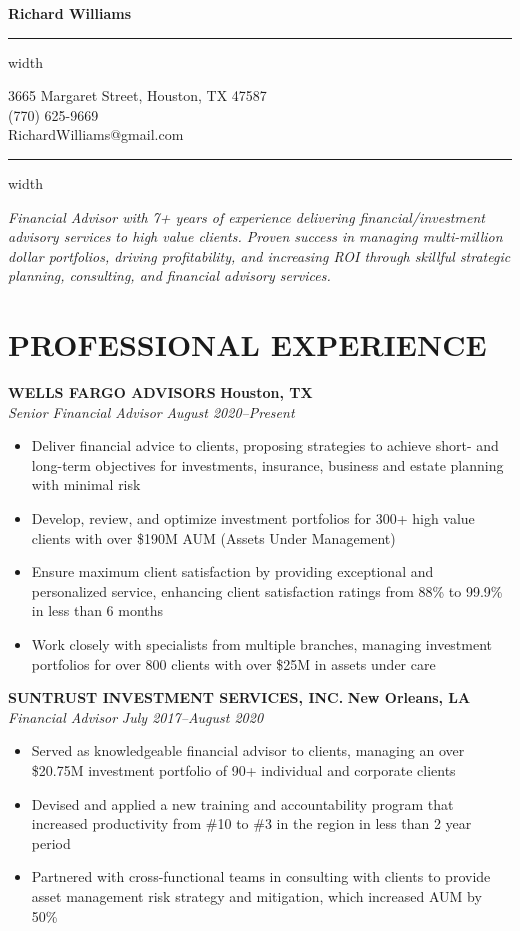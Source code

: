 \documentclass[11pt,letterpaper]{article}
\newcommand{\name}[1]{
  \begin{center}
    \Huge\textbf{#1}
  \end{center}
  \vspace{-0.5em}
  \hrule height 0.4pt width \textwidth
  \vspace{0.5em}
}
\newcommand{\contact}[3]{
  \begin{center}
    #1 \\ #2 \\ #3
  \end{center}
  \vspace{-0.5em}
  \hrule height 0.4pt width \textwidth
  \vspace{0.5em}
}
\newcommand{\role}[4]{
  \begin{center}
    \textbf{#1} \hfill \textbf{#2} \\
    \textit{#3} \hfill \textit{#4}
  \end{center}
}
\begin{document}
\name{Richard Williams}
\vspace{-0.5em}
\contact{3665 Margaret Street, Houston, TX 47587}{(770) 625-9669}{RichardWilliams@gmail.com}

\vspace{-0.5em}
\begin{center}
\textit{Financial Advisor with 7+ years of experience delivering financial/investment advisory services to high value clients. Proven success in managing multi-million dollar portfolios, driving profitability, and increasing ROI through skillful strategic planning, consulting, and financial advisory services.}
\end{center}

\section{PROFESSIONAL EXPERIENCE}

\vspace{1em}
\role{WELLS FARGO ADVISORS}{Houston, TX}{Senior Financial Advisor}{August 2020--Present}
\begin{itemize}[leftmargin=*,nosep]
  \item Deliver financial advice to clients, proposing strategies to achieve short- and long-term objectives for investments, insurance, business and estate planning with minimal risk
  \item Develop, review, and optimize investment portfolios for 300+ high value clients with over \$190M AUM (Assets Under Management)
  \item Ensure maximum client satisfaction by providing exceptional and personalized service, enhancing client satisfaction ratings from 88\% to 99.9\% in less than 6 months
  \item Work closely with specialists from multiple branches, managing investment portfolios for over 800 clients with over \$25M in assets under care
\end{itemize}

\role{SUNTRUST INVESTMENT SERVICES, INC.}{New Orleans, LA}{Financial Advisor}{July 2017--August 2020}
\begin{itemize}[leftmargin=*,nosep,topsep=0pt]
  \item Served as knowledgeable financial advisor to clients, managing an over \$20.75M investment portfolio of 90+ individual and corporate clients
  \item Devised and applied a new training and accountability program that increased productivity from \#10 to \#3 in the region in less than 2 year period
  \item Partnered with cross-functional teams in consulting with clients to provide asset management risk strategy and mitigation, which increased AUM by 50\%
\end{itemize}
\end{document}
